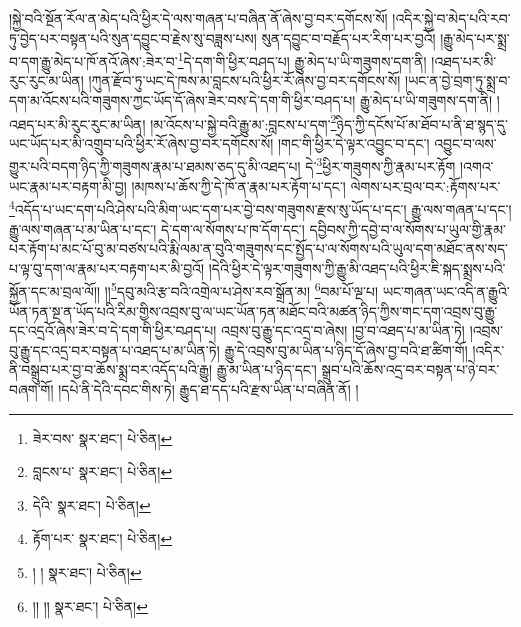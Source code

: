 །སྐྱེ་བའི་སྔོན་རོལ་ན་མེད་པའི་ཕྱིར་དེ་ལས་གཞན་པ་བཞིན་ནོ་ཞེས་བྱ་བར་དགོངས་སོ། །འདིར་སྐྱེ་བ་མེད་པའི་རབ་ཏུ་བྱེད་པར་བསྟན་པའི་སུན་དབྱུང་བ་རྗེས་སུ་བཟླས་པས། སུན་དབྱུང་བ་བརྗོད་པར་རིག་པར་བྱའོ། །རྒྱུ་མེད་པར་སྨྲ་བ་དག་རྒྱུ་མེད་པ་ཁོ་ནའོ་ཞེས་:ཟེར་བ་\footnote{ཟེར་བས་  སྣར་ཐང་།  པེ་ཅིན། }དེ་དག་གི་ཕྱིར་བཤད་པ། རྒྱུ་མེད་པ་ཡི་གཟུགས་དག་ནི། །འཐད་པར་མི་རུང་རུང་མ་ཡིན། །ཀུན་རྫོབ་ཏུ་ཡང་དེ་ཁས་མ་བླངས་པའི་ཕྱིར་རོ་ཞེས་བྱ་བར་དགོངས་སོ། །ཡང་ན་བྱེ་བྲག་ཏུ་སྨྲ་བ་དག་མ་འོངས་པའི་གཟུགས་ཀྱང་ཡོད་དོ་ཞེས་ཟེར་བས་དེ་དག་གི་ཕྱིར་བཤད་པ། རྒྱུ་མེད་པ་ཡི་གཟུགས་དག་ནི། །འཐད་པར་མི་རུང་རུང་མ་ཡིན། །མ་འོངས་པ་སྐྱེ་བའི་རྒྱུ་མ་:བླངས་པ་དག་\footnote{བླངས་པ་  སྣར་ཐང་།  པེ་ཅིན། }ཉིད་ཀྱི་དངོས་པོ་མ་ཐོབ་པ་ནི་ཐ་སྙད་དུ་ཡང་ཡོད་པར་མི་འགྲུབ་པའི་ཕྱིར་རོ་ཞེས་བྱ་བར་དགོངས་སོ། །གང་གི་ཕྱིར་དེ་ལྟར་འབྱུང་བ་དང་། འབྱུང་བ་ལས་གྱུར་པའི་བདག་ཉིད་ཀྱི་གཟུགས་རྣམ་པ་ཐམས་ཅད་དུ་མི་འཐད་པ། དེ་\footnote{དེའི་  སྣར་ཐང་།  པེ་ཅིན། }ཕྱིར་གཟུགས་ཀྱི་རྣམ་པར་རྟོག །འགའ་ཡང་རྣམ་པར་བརྟག་མི་བྱ། །མཁས་པ་ཆོས་ཀྱི་དེ་ཁོ་ན་རྣམ་པར་རྟོག་པ་དང་། ལེགས་པར་བྲལ་བར་:རྟོགས་པར་\footnote{རྟོག་པར་  སྣར་ཐང་།  པེ་ཅིན། }འདོད་པ་ཡང་དག་པའི་ཤེས་པའི་མིག་ཡང་དག་པར་བྱེ་བས་གཟུགས་རྫས་སུ་ཡོད་པ་དང་། རྒྱུ་ལས་གཞན་པ་དང་། རྒྱུ་ལས་གཞན་པ་མ་ཡིན་པ་དང་། དེ་དག་ལ་སོགས་པ་ཁ་དོག་དང་། དབྱིབས་ཀྱི་དབྱེ་བ་ལ་སོགས་པ་ཡུལ་གྱི་རྣམ་པར་རྟོག་པ་མང་པོ་བུ་མ་བཙས་པའི་རྨི་ལམ་ན་བུའི་གཟུགས་དང་སྤྱོད་པ་ལ་སོགས་པའི་ཡུལ་དག་མཐོང་ནས་སད་པ་ལྟ་བུ་དག་ལ་རྣམ་པར་བརྟག་པར་མི་བྱའོ། །དེའི་ཕྱིར་དེ་ལྟར་གཟུགས་ཀྱི་རྒྱུ་མི་འཐད་པའི་ཕྱིར་ཇི་སྐད་སྨྲས་པའི་སྐྱོན་དང་མ་བྲལ་ལོ།། །།\footnote{། །  སྣར་ཐང་།  པེ་ཅིན། }དབུ་མའི་རྩ་བའི་འགྲེལ་པ་ཤེས་རབ་སྒྲོན་མ། \footnote{།། །།  སྣར་ཐང་།  པེ་ཅིན། }བམ་པོ་ལྔ་པ། ཡང་གཞན་ཡང་འདི་ན་རྒྱུའི་ཡོན་ཏན་སྔ་ན་ཡོད་པའི་རིམ་གྱིས་འབྲས་བུ་ལ་ཡང་ཡོན་ཏན་མཐོང་བའི་མཚན་ཉིད་ཀྱིས་གང་དག་འབྲས་བུ་རྒྱུ་དང་འདྲའོ་ཞེས་ཟེར་བ་དེ་དག་གི་ཕྱིར་བཤད་པ། འབྲས་བུ་རྒྱུ་དང་འདྲ་བ་ཞེས། །བྱ་བ་འཐད་པ་མ་ཡིན་ཏེ། །འབྲས་བུ་རྒྱུ་དང་འདྲ་བར་བསྟན་པ་འཐད་པ་མ་ཡིན་ཏེ། རྒྱུ་དེ་འབྲས་བུ་མ་ཡིན་པ་ཉིད་དོ་ཞེས་བྱ་བའི་ཐ་ཚིག་གོ། །འདིར་ནི་བསྒྲུབ་པར་བྱ་བ་ཆོས་སྨྲ་བར་འདོད་པའི་རྒྱུ། རྒྱུ་མ་ཡིན་པ་ཉིད་དང་། སྒྲུབ་པའི་ཆོས་འདྲ་བར་བསྟན་པ་ཉེ་བར་བཞག་གོ། །དཔེ་ནི་དེའི་དབང་གིས་ཏེ། རྒྱུད་ཐ་དད་པའི་རྫས་ཡིན་པ་བཞིན་ནོ། །
